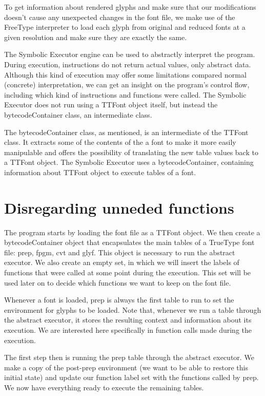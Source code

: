 \documentclass[12pt]{article}
\begin{document}
To get information about rendered glyphs and make sure that
our modifications doesn't cause any unexpected changes in the font file,
we make use of the FreeType interpreter to load each glyph from original
and reduced fonts at a given resolution and make sure they are exactly
the same. 

The Symbolic Executor engine can be used to abstractly interpret the
program. During execution, instructions do not return actual values,
only abstract data. Although this kind of execution may offer some
limitations compared normal (concrete) interpretation, we can get an
insight on the program's control flow, including which kind of
instructions and functions were called. The Symbolic Executor does not
run using a TTFont object itself, but instead the bytecodeContainer
class, an intermediate class.

The bytecodeContainer class, as mentioned, is an intermediate of
the TTFont class. It extracts some of the contents of the a font to make
it more easily manipulable and offers the possibility of translating the
new table values back to a TTFont object. The Symbolic Executor uses a
bytecodeContainer, containing information about TTFont object to execute
tables of a font.

\section{Disregarding unneded functions}

The program starts by loading the font file as a TTFont object.
We then create a bytecodeContainer object that encapsulates the main
tables of a TrueType font file: prep, fpgm, cvt and glyf. This object 
is necessary to run the abstract executor. We also create an empty set, 
in which we will insert the labels of functions that were called at some 
point during the execution. This set will be used later on to decide 
which functions we want to keep on the font file.

Whenever a font is loaded, prep is always the first table to run to 
set the environment for glyphs to be loaded. Note that, whenever we run
a table through the abstract executor, it stores the resulting context
and information about its execution. We are interested here specifically
in function calls made during the execution.

The first step then is running the prep table through the abstract 
executor. We make a copy of the post-prep environment (we want to be
able to restore this initial state) and update our function label
set with the functions called by prep. We now have everything ready to
execute the remaining tables.
\end{document}
